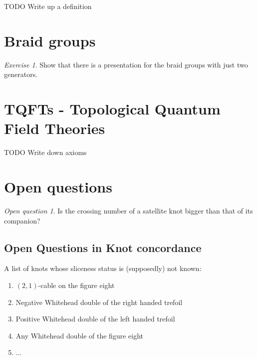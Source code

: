 \documentclass[nobib]{tufte-book} %
\theoremstyle{definition}
\theoremstyle{remark}
\newtheorem{openquestion}{Open question}
\newtheorem{exercise}{Exercise}
\begin{document}
TODO Write up a definition




\section{Braid groups}

\begin{exercise}
	Show that there is a presentation for the braid groups
	with just two generators.
\end{exercise}

\section{TQFTs - Topological Quantum Field Theories}

TODO Write down axioms


\section{Open questions}

\begin{openquestion}
	Is the crossing number of a satellite knot bigger than that of its companion?
\end{openquestion}



\subsection{Open Questions in Knot concordance}

A list of knots whose sliceness status is (supposedly) not known:
\begin{enumerate}
	\item $(2, 1)$-cable on the figure eight
	\item Negative Whitehead double of the right handed trefoil
	\item Positive Whitehead double of the left handed trefoil
	\item Any Whitehead double of the figure eight
	\item ...
\end{enumerate}
\end{document}
